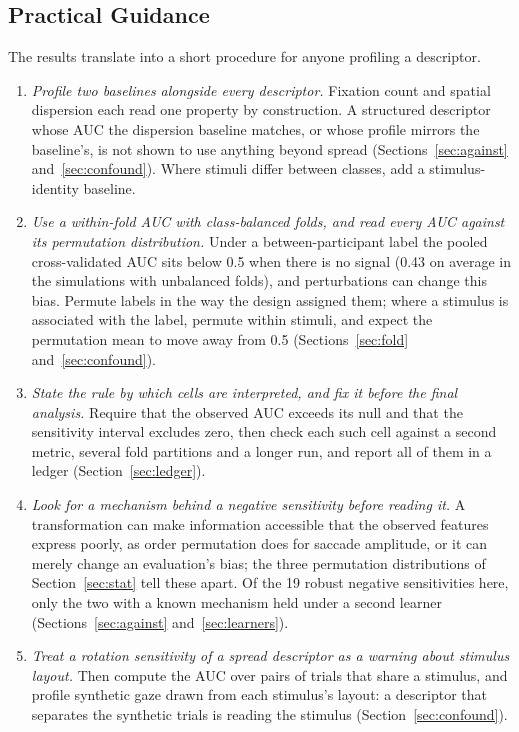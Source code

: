\documentclass[11pt]{article}
\begin{document}
\subsection{Practical Guidance}\label{sec:guide}
The results translate into a short procedure for anyone profiling a descriptor.
\begin{enumerate}
\item \emph{Profile two baselines alongside every descriptor.} Fixation count and spatial dispersion each read one property by construction. A structured descriptor whose AUC the dispersion baseline matches, or whose profile mirrors the baseline's, is not shown to use anything beyond spread (Sections~\ref{sec:against} and~\ref{sec:confound}). Where stimuli differ between classes, add a stimulus-identity baseline.
\item \emph{Use a within-fold AUC with class-balanced folds, and read every AUC against its permutation distribution.} Under a between-participant label the pooled cross-validated AUC sits below 0.5 when there is no signal (0.43 on average in the simulations with unbalanced folds), and perturbations can change this bias. Permute labels in the way the design assigned them; where a stimulus is associated with the label, permute within stimuli, and expect the permutation mean to move away from 0.5 (Sections~\ref{sec:fold} and~\ref{sec:confound}).
\item \emph{State the rule by which cells are interpreted, and fix it before the final analysis.} Require that the observed AUC exceeds its null and that the sensitivity interval excludes zero, then check each such cell against a second metric, several fold partitions and a longer run, and report all of them in a ledger (Section~\ref{sec:ledger}).
\item \emph{Look for a mechanism behind a negative sensitivity before reading it.} A transformation can make information accessible that the observed features express poorly, as order permutation does for saccade amplitude, or it can merely change an evaluation's bias; the three permutation distributions of Section~\ref{sec:stat} tell these apart. Of the 19 robust negative sensitivities here, only the two with a known mechanism held under a second learner (Sections~\ref{sec:against} and~\ref{sec:learners}).
\item \emph{Treat a rotation sensitivity of a spread descriptor as a warning about stimulus layout.} Then compute the AUC over pairs of trials that share a stimulus, and profile synthetic gaze drawn from each stimulus's layout: a descriptor that separates the synthetic trials is reading the stimulus (Section~\ref{sec:confound}).

\end{enumerate}
\end{document}
